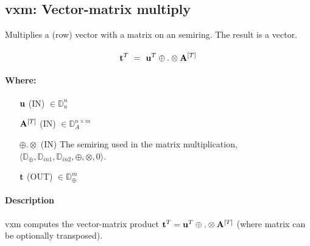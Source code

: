 
\subsection{{\sf vxm}: Vector-matrix multiply}

Multiplies a (row) vector with a matrix on an semiring. The result is a vector.

\paragraph{\syntax}

$$
{\bf t}^T ~ = ~ {\bf u}^{T} \oplus.\otimes {\bf A}^{[T]}
$$

\paragraph{Where:}

\begin{itemize}[leftmargin=1.1in]
    \item[${\bf u}$]    ({\sf IN}) $\in \mathbb{D}_{u}^{n}$

    \item[${\bf A}^{[T]}$]    ({\sf IN}) $\in \mathbb{D}_A^{n\times m}$

    \item[$\oplus.\otimes$]   ({\sf IN}) The semiring used in the matrix
    multiplication, $\langle \mathbb{D}_\oplus, \mathbb{D}_{in1},\mathbb{D}_{in2},\oplus,\otimes,0 \rangle$.

    \item[${\bf t}$]    ({\sf OUT}) $\in \mathbb{D}_\oplus^{m}$

\end{itemize}

\paragraph{Description}

{\sf vxm} computes the vector-matrix product 
${\bf t}^T = {\bf u}^T \oplus . \otimes {\bf A}^{[T]}$ 
(where matrix  can be optionally transposed).




